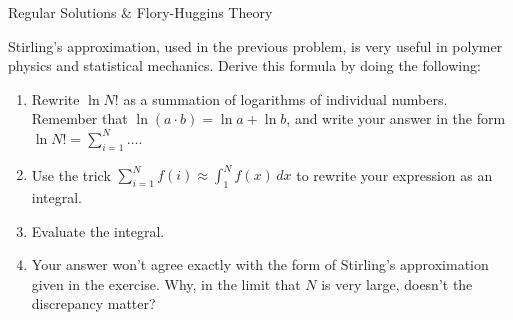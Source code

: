 \begin{activity}{Regular Solutions \& Flory-Huggins Theory}
\begin{exercises}
\begin{enumerate}
			\end{enumerate}



		\exercise Stirling's approximation, used in the previous problem, is very useful in polymer physics and statistical mechanics.  Derive this formula by doing the following:
			\begin{enumerate}
				\item Rewrite $\ln N!$ as a summation of logarithms of individual numbers.  Remember that $\ln (a\cdot b) = \ln a + \ln b$, and write your answer in the form $\ln N! = \sum_{i=1}^N \dots$.
				
					\begin{solution}\end{solution}
					
				\item Use the trick $\sum_{i=1}^{N} f(i) \approx \int_1^N f(x)\,dx$ to rewrite your expression as an integral.
				
					\begin{solution}\end{solution}
					
				\item Evaluate the integral.
				
					\begin{solution}\end{solution}
					
				\item Your answer won't agree exactly with the form of Stirling's approximation given in the exercise.  Why, in the limit that $N$ is very large, doesn't the discrepancy matter?
				

\end{enumerate}
\end{exercises}
\end{activity}
